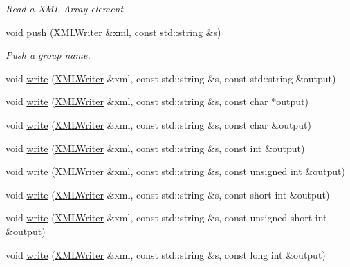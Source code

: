\begin{DoxyCompactItemize}
\begin{DoxyCompactList}\small\item\em Read a X\+ML Array element. \end{DoxyCompactList}\item 
void \mbox{\hyperlink{group__io_ga019b535f09d2107aa9012cd3fce58193}{push}} (\mbox{\hyperlink{classADATXML_1_1XMLWriter}{X\+M\+L\+Writer}} \&xml, const std\+::string \&s)
\begin{DoxyCompactList}\small\item\em Push a group name. \end{DoxyCompactList}\item 
void \mbox{\hyperlink{group__io_ga20a076b653822e9476b7712de61b383c}{write}} (\mbox{\hyperlink{classADATXML_1_1XMLWriter}{X\+M\+L\+Writer}} \&xml, const std\+::string \&s, const std\+::string \&output)
\item 
void \mbox{\hyperlink{group__io_gafaebe3bd91fd5654568bc862bded8d3d}{write}} (\mbox{\hyperlink{classADATXML_1_1XMLWriter}{X\+M\+L\+Writer}} \&xml, const std\+::string \&s, const char $\ast$output)
\item 
void \mbox{\hyperlink{group__io_ga397db53ca185f22405c43c5b5f6e6a8d}{write}} (\mbox{\hyperlink{classADATXML_1_1XMLWriter}{X\+M\+L\+Writer}} \&xml, const std\+::string \&s, const char \&output)
\item 
void \mbox{\hyperlink{group__io_gadc4b57f737a20fc500619ce19834df8e}{write}} (\mbox{\hyperlink{classADATXML_1_1XMLWriter}{X\+M\+L\+Writer}} \&xml, const std\+::string \&s, const int \&output)
\item 
void \mbox{\hyperlink{group__io_ga5856cc9bbcc04728d4c4c248085478d6}{write}} (\mbox{\hyperlink{classADATXML_1_1XMLWriter}{X\+M\+L\+Writer}} \&xml, const std\+::string \&s, const unsigned int \&output)
\item 
void \mbox{\hyperlink{group__io_ga0576b7ad74a4cc939c5fd164dddd2ac9}{write}} (\mbox{\hyperlink{classADATXML_1_1XMLWriter}{X\+M\+L\+Writer}} \&xml, const std\+::string \&s, const short int \&output)
\item 
void \mbox{\hyperlink{group__io_gabe7167254a6bfbd7e4d5046e1758e48f}{write}} (\mbox{\hyperlink{classADATXML_1_1XMLWriter}{X\+M\+L\+Writer}} \&xml, const std\+::string \&s, const unsigned short int \&output)
\item 
void \mbox{\hyperlink{group__io_gae6391d5ecac6e646e20a7cc2dd67ffbd}{write}} (\mbox{\hyperlink{classADATXML_1_1XMLWriter}{X\+M\+L\+Writer}} \&xml, const std\+::string \&s, const long int \&output)
\item 

\end{DoxyCompactItemize}

